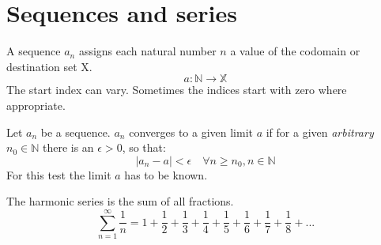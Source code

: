 \chapter{Sequences and series}

\begin{definition}[Sequence]
    A sequence $a_n$ assigns each natural number $n$ a value of the codomain or destination set X.
    \begin{equation}
        a:\mathbb{N} \rightarrow \mathbb{X}
    \end{equation}
    The start index can vary. Sometimes the indices start with zero where appropriate.
\end{definition}

\begin{definition}
    Let $a_n$ be a sequence. 
    $a_n$ converges to a given limit $a$ if for a given \emph{arbitrary} $n_0 \in \mathbb{N}$ 
    there is an $\epsilon>0$, so that:
    \begin{equation}
        |a_n - a| < \epsilon \quad \forall n \ge n_0, n \in \mathbb{N}
    \end{equation}
    For this test the limit $a$ has to be known.
\end{definition}

\begin{definition}
    The harmonic series is the sum of all fractions.
    \begin{equation}
        \sum_{n=1}^{\infty}\frac{1}{n} = 
            1 + 
            \frac{1}{2} + 
            \frac{1}{3} + \frac{1}{4} + 
            \frac{1}{5} + \frac{1}{6} + \frac{1}{7} + \frac{1}{8} + ...
    \end{equation}
\end{definition}

